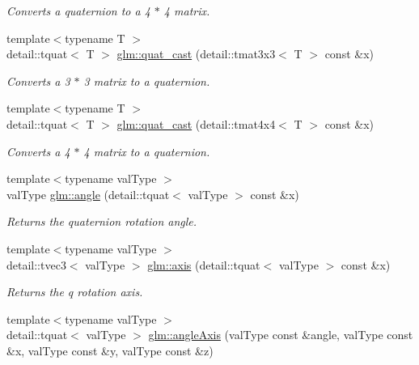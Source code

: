 \begin{DoxyCompactItemize}
\begin{DoxyCompactList}\small\item\em Converts a quaternion to a 4 $\ast$ 4 matrix. \end{DoxyCompactList}\item 
{\footnotesize template$<$typename T $>$ }\\detail\-::tquat$<$ T $>$ \hyperlink{group__gtc__quaternion_ga4d37447d81ceade1d10d68c995a4d881}{glm\-::quat\-\_\-cast} (detail\-::tmat3x3$<$ T $>$ const \&x)
\begin{DoxyCompactList}\small\item\em Converts a 3 $\ast$ 3 matrix to a quaternion. \end{DoxyCompactList}\item 
{\footnotesize template$<$typename T $>$ }\\detail\-::tquat$<$ T $>$ \hyperlink{group__gtc__quaternion_ga24adafe33b0bcad906c8724a762e5299}{glm\-::quat\-\_\-cast} (detail\-::tmat4x4$<$ T $>$ const \&x)
\begin{DoxyCompactList}\small\item\em Converts a 4 $\ast$ 4 matrix to a quaternion. \end{DoxyCompactList}\item 
{\footnotesize template$<$typename val\-Type $>$ }\\val\-Type \hyperlink{group__gtc__quaternion_ga69041d18bd8539fe82d6170932d28362}{glm\-::angle} (detail\-::tquat$<$ val\-Type $>$ const \&x)
\begin{DoxyCompactList}\small\item\em Returns the quaternion rotation angle. \end{DoxyCompactList}\item 
{\footnotesize template$<$typename val\-Type $>$ }\\detail\-::tvec3$<$ val\-Type $>$ \hyperlink{group__gtc__quaternion_ga72457604550d0414e522dbec0d98f276}{glm\-::axis} (detail\-::tquat$<$ val\-Type $>$ const \&x)
\begin{DoxyCompactList}\small\item\em Returns the q rotation axis. \end{DoxyCompactList}\item 
{\footnotesize template$<$typename val\-Type $>$ }\\detail\-::tquat$<$ val\-Type $>$ \hyperlink{group__gtc__quaternion_gaafc03953867e42a39dc08575ad4532ad}{glm\-::angle\-Axis} (val\-Type const \&angle, val\-Type const \&x, val\-Type const \&y, val\-Type const \&z)

\end{DoxyCompactItemize}
